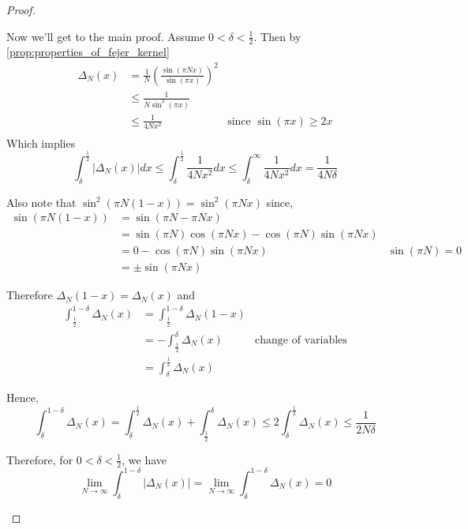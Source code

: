 \begin{proof}
\begin{enumerate}[label=(\alph*)]
        Now we'll get to the main proof. Assume $0 < \delta < \frac{1}{2}$. Then by \ref{prop:properties_of_fejer_kernel}
       \begin{align*}
         \Delta_N(x) &= \frac{1}{N}\left(\frac{\sin(\pi Nx)}{\sin(\pi x)}\right)^2 \\
                &\le \frac{1}{N\sin^2(\pi x)} \\
                &\le \frac{1}{4Nx^2} &\text{since } \sin(\pi x) \ge 2x \\
       \end{align*}
        Which implies
        \begin{displaymath}
          \int_\delta^\frac{1}{2} \left| \Delta_N(x) \right| dx \le \int_\delta^\frac{1}{2} \frac{1}{4Nx^2} dx \le \int_\delta^\infty \frac{1}{4Nx^2} dx = \frac{1}{4N\delta}
        \end{displaymath}

        Also note that $\sin^2(\pi N(1-x)) = \sin^2(\pi Nx)$ since,
        \begin{align*}
          \sin(\pi N(1-x))  &= \sin(\pi N - \pi Nx) \\
                            &= \sin( \pi N)\cos(\pi Nx) - \cos(\pi N)\sin(\pi Nx) \\
                            &= 0 - \cos(\pi N)\sin(\pi Nx) & \sin(\pi N) = 0\\
                            &= \pm \sin(\pi Nx)
        \end{align*}

        Therefore $\Delta_N(1-x) = \Delta_N(x)$ and 
        \begin{align*}
          \int_\frac{1}{2}^{1-\delta} \Delta_N(x) &= \int_\frac{1}{2}^{1-\delta} \Delta_N(1-x)  \\
                &= -\int_\frac{1}{2}^\delta \Delta_N(x) & \text{change of variables} \\
                &=  \int_\delta^\frac{1}{2} \Delta_N(x)
        \end{align*}

        Hence,
        \begin{displaymath}
          \int_\delta^{1-\delta} \Delta_N(x) = \int_\delta^\frac{1}{2} \Delta_N(x) + \int_\frac{1}{2}^\delta \Delta_N(x) \le 2 \int_\delta^\frac{1}{2} \Delta_N(x) \le \frac{1}{2N\delta}
        \end{displaymath}
       
        Therefore, for $0 < \delta < \frac{1}{2}$, we have 
        \begin{displaymath}
          \lim_{N \to \infty} \int_\delta^{1-\delta} \left|\Delta_N(x)\right| = \lim_{N \to \infty} \int_\delta^{1-\delta} \Delta_N(x) = 0
        \end{displaymath}


\end{enumerate}
\end{proof}

